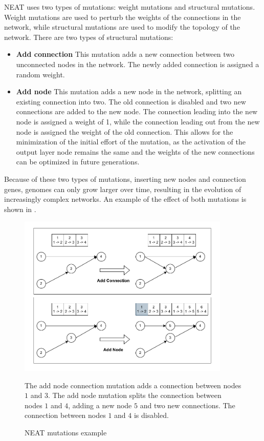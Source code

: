 NEAT uses two types of mutations: weight mutations and structural mutations. Weight mutations are used to perturb the weights of the connections in the network, while
structural mutations are used to modify the topology of the network. There are two types of structural mutations:

\begin{itemize}
    \item \textbf{Add connection} This mutation adds a new connection between two unconnected nodes in the network. The newly added connection is assigned a random weight.
    \item \textbf{Add node} This mutation adds a new node in the network, splitting an existing connection into two. The old connection is disabled and two new
        connections are added to the new node. The connection leading into the new node is assigned a weight of 1, while the connection leading out from the new node is
        assigned the weight of the old connection. This allows for the minimization of the initial effort of the mutation, as the activation of the output layer
        node remains the same and the weights of the new connections can be optimized in future generations.
\end{itemize}

Because of these two types of mutations, inserting new nodes and connection genes, genomes can only grow larger over time, resulting in the evolution of increasingly
complex networks. An example of the effect of both mutations is shown in .

\begin{figure}
    \centering
    \includegraphics[width=0.9\textwidth]{Pictures/neat_mutations}
    \caption{NEAT mutations example}{The add node connection mutation adds a connection between nodes $1$ and $3$.
    The add node mutation splits the connection between nodes $1$ and $4$, adding a new node $5$ and two new connections. The connection between nodes $1$ and $4$ is disabled.}
    \label{fig:neat_mutations}
\end{figure}

